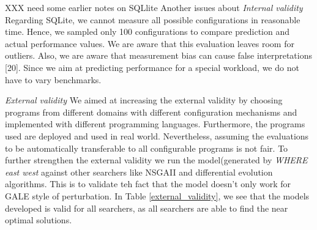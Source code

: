 \documentclass{sig-alternative}
\begin{document}
XXX need some earlier notes on SQLlite \newline Another issues about {\em Internal validity}
Regarding SQLite, we cannot measure all possible configurations in reasonable time. Hence, we sampled only 100 configurations to compare prediction and actual performance values. We are aware that this evaluation leaves room for outliers.
Also, we are aware that measurement bias can cause false interpretations [20]. Since we aim at predicting performance for a special workload, we do not have to vary benchmarks.



{\em External validity}  We aimed at increasing the external validity by choosing programs from different domains with different configuration mechanisms and implemented with different programming languages. Furthermore, the programs used are deployed and used in real world. Nevertheless, assuming the evaluations to be automatically transferable  to all configurable programs is not fair. To further strengthen the external validity we run the model(generated by \textit{WHERE east west} against other searchers like NSGAII and differential evolution algorithms\cite{storn1997differential}. This is to validate teh fact that the model doesn't only work for GALE style of perturbation. In Table \ref{external_validity}, we see that the models developed is valid for all searchers, as all searchers are able to find the near optimal solutions.
\end{document}
